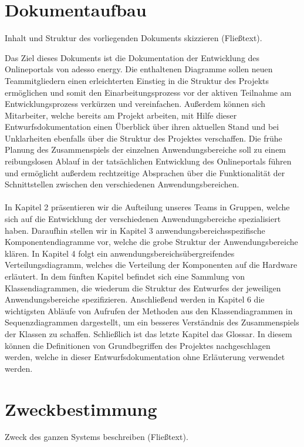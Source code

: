\section{Dokumentaufbau}\label{sec:dokumentaufbau}
\begin{tcolorbox}
	Inhalt und Struktur des vorliegenden Dokuments skizzieren (Fließtext).
\end{tcolorbox}
Das Ziel dieses Dokuments ist die Dokumentation der Entwicklung des Onlineportals von adesso energy. 
Die enthaltenen Diagramme sollen neuen Teammitgliedern einen erleichterten Einstieg in die Struktur des Projekts ermöglichen 
und somit den Einarbeitungsprozess vor der aktiven Teilnahme am Entwicklungsprozess verkürzen und vereinfachen.  
Außerdem können sich Mitarbeiter, welche bereits am Projekt arbeiten, mit Hilfe dieser Entwurfsdokumentation einen Überblick über 
ihren aktuellen Stand und bei Unklarheiten ebenfalls über die Struktur des Projektes verschaffen.
Die frühe Planung des Zusammenspiels der einzelnen Anwendungsbereiche soll zu einem reibungslosen Ablauf 
in der tatsächlichen Entwicklung des Onlineportals führen und ermöglicht außerdem rechtzeitige Absprachen über die Funktionalität 
der Schnittstellen zwischen den verschiedenen Anwendungsbereichen.\\\\
In Kapitel 2 präsentieren wir die Aufteilung unseres Teams in Gruppen, welche sich auf die Entwicklung 
der verschiedenen Anwendungsbereiche spezialisiert haben. Daraufhin stellen wir in Kapitel 3 anwendungsbereichsspezifische 
Komponentendiagramme vor, welche die grobe Struktur der Anwendungsbereiche klären.
In Kapitel 4 folgt ein anwendungsbereichsübergreifendes Verteilungsdiagramm, welches die Verteilung der Komponenten auf die Hardware erläutert. 
In dem fünften Kapitel befindet sich eine Sammlung von Klassendiagrammen, die wiederum die Struktur des Entwurfes 
der jeweiligen Anwendungsbereiche spezifizieren. Anschließend werden in Kapitel 6 die wichtigsten Abläufe von Aufrufen 
der Methoden aus den Klassendiagrammen in Sequenzdiagrammen dargestellt, um ein besseres Verständnis 
des Zusammenspiels der Klassen zu schaffen. Schließlich ist das letzte Kapitel das Glossar. 
In diesem können die Definitionen von Grundbegriffen des Projektes nachgeschlagen werden, welche in 
dieser Entwurfsdokumentation ohne Erläuterung verwendet werden.

\section{Zweckbestimmung}\label{sec:zweckbestimmung}
\begin{tcolorbox}
	Zweck des ganzen Systems beschreiben (Fließtext).
\end{tcolorbox}

